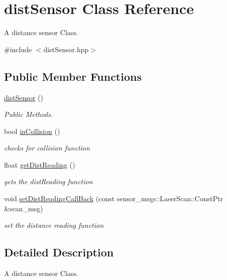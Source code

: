 \hypertarget{classdistSensor}{}\section{dist\+Sensor Class Reference}
\label{classdistSensor}


A distance sensor Class.  




{\ttfamily \#include $<$dist\+Sensor.\+hpp$>$}

\subsection*{Public Member Functions}
\begin{DoxyCompactItemize}
\item 
\hyperlink{classdistSensor_a223961092cb0887a44f95bc7e6f6eebf}{dist\+Sensor} ()
\begin{DoxyCompactList}\small\item\em Public Methods. \end{DoxyCompactList}\item 
bool \hyperlink{classdistSensor_a2413d0d53a7f92d6482b1e0b70a4fd85}{in\+Collision} ()
\begin{DoxyCompactList}\small\item\em checks for collision function \end{DoxyCompactList}\item 
float \hyperlink{classdistSensor_afe4776ddc43222201b97e4c85d90e97c}{get\+Dist\+Reading} ()
\begin{DoxyCompactList}\small\item\em gets the dist\+Reading function \end{DoxyCompactList}\item 
void \hyperlink{classdistSensor_a7a209f4f5b2ddf97e65f0b97070ed20e}{set\+Dist\+Reading\+Call\+Back} (const sensor\+\_\+msgs\+::\+Laser\+Scan\+::\+Const\+Ptr \&scan\+\_\+msg)
\begin{DoxyCompactList}\small\item\em set the distance reading function \end{DoxyCompactList}\end{DoxyCompactItemize}


\subsection{Detailed Description}
A distance sensor Class. 

